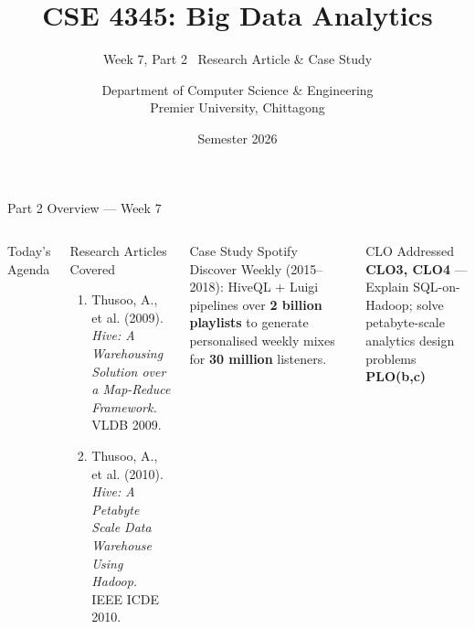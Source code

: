 \documentclass[aspectratio=169,10pt]{beamer}
\title[CSE 4345 \textbar{} Week 7, Part 2]{CSE 4345: Big Data Analytics}
\subtitle{Week 7, Part 2 \textemdash\ Research Article \& Case Study}
\author[Dept.\ of CSE]{Department of Computer Science \& Engineering\\[4pt]
       \small Premier University, Chittagong}
\institute{}
\date{Semester 2026}
\begin{document}

\begin{frame}
  \titlepage
\end{frame}

\begin{frame}{Part 2 Overview — Week 7}
  \begin{columns}[T]
      \begin{block}{Today's Agenda}
        \tableofcontents
      \end{block}

      \begin{exampleblock}{Research Articles Covered}
        \begin{enumerate}
          \item Thusoo, A., et al. (2009).
                \textit{Hive: A Warehousing Solution over a
                Map-Reduce Framework.} VLDB 2009.
          \item Thusoo, A., et al. (2010).
                \textit{Hive: A Petabyte Scale Data Warehouse
                Using Hadoop.} IEEE ICDE 2010.
        \end{enumerate}
      \end{exampleblock}
      \vspace{6pt}
      \begin{alertblock}{Case Study}
        Spotify Discover Weekly (2015--2018):
        HiveQL + Luigi pipelines over \textbf{2 billion playlists}
        to generate personalised weekly mixes for
        \textbf{30 million} listeners.
      \end{alertblock}
      \vspace{4pt}
      \begin{block}{CLO Addressed}
        \textbf{CLO3, CLO4} — Explain SQL-on-Hadoop; solve
        petabyte-scale analytics design problems\\
        \textbf{PLO(b,c)}
      \end{block}
  \end{columns}
\end{frame}

\end{document}
